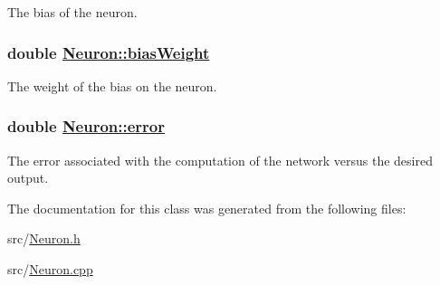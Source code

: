 The bias of the neuron. \hypertarget{classNeuron_27aa94b5d7658f718711cedb3f96dc7f}{
\subsubsection[biasWeight]{\setlength{\rightskip}{0pt plus 5cm}double \hyperlink{classNeuron_27aa94b5d7658f718711cedb3f96dc7f}{Neuron::bias\-Weight}}}
\label{classNeuron_27aa94b5d7658f718711cedb3f96dc7f}


The weight of the bias on the neuron. \hypertarget{classNeuron_d4d851d9f4f5dccb6283e5c19726e1e7}{
\subsubsection[error]{\setlength{\rightskip}{0pt plus 5cm}double \hyperlink{classNeuron_d4d851d9f4f5dccb6283e5c19726e1e7}{Neuron::error}}}
\label{classNeuron_d4d851d9f4f5dccb6283e5c19726e1e7}


The error associated with the computation of the network versus the desired output. 

The documentation for this class was generated from the following files:\begin{CompactItemize}
\item 
src/\hyperlink{Neuron_8h}{Neuron.h}\item 
src/\hyperlink{Neuron_8cpp}{Neuron.cpp}\end{CompactItemize}

